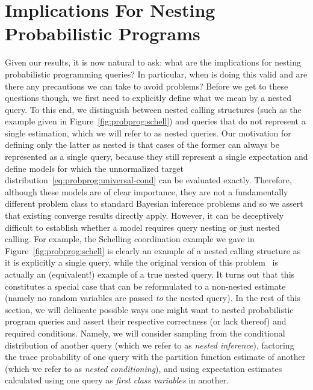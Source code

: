 
\section{Implications For Nesting Probabilistic Programs}
\label{sec:nest:imp}

Given our results, it is now natural to ask: what are the implications for nesting probabilistic programming queries?
In particular, when is doing
this valid and are there any precautions we can take to avoid problems?  Before
we get to these questions though, we first need to explicitly define what we
mean by a nested query.  To this end, we distinguish between nested calling
structures (such as the example given in Figure~\ref{fig:probprog:schell}) and
queries that do not represent a single estimation, which we will refer
to as nested queries. Our motivation for defining only the latter
as nested is that cases of the former can always be represented as a single
query, because they still represent a single expectation and define models
for which the unnormalized target distribution~\eqref{eq:probprog:universal-cond}
 can be evaluated exactly.  Therefore, although these models are
of clear importance, they are not a fundamentally different problem class
to standard Bayesian inference problems and so we assert that existing \mc
converge results directly apply.  However, it can be deceptively difficult to establish
whether a model requires query nesting or just nested calling.
For example, the Schelling coordination example we gave in Figure~\ref{fig:probprog:schell}
is clearly an example of a nested calling structure as it is explicitly a single query,
while the original version of this problem~\cite[Figure 6]{stuhlmuller2014reasoning}
is actually an (equivalent!) example of a true nested query.  It turns out that this
constitutes a special case that can be reformulated to a non-nested estimate (namely
no random variables are passed \emph{to} the nested query).
In the rest of this section, we will delineate possible ways one might want
to nested probabilistic program queries and
assert their respective correctness (or lack thereof) and required conditions.
Namely, we will consider
sampling from the conditional
distribution of another query (which we refer to as \emph{nested
inference}), factoring the trace probability of one query
with the partition function estimate of another (which we
refer to as \emph{nested conditioning}), and using expectation estimates
calculated using one query as \emph{first class variables}
in another.

